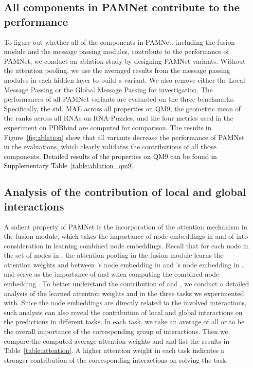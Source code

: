 \documentclass[fleqn,10pt]{wlscirep}
\newcommand{\method}{PAMNet\xspace}
\begin{document}
\subsection*{All components in \method contribute to the performance
}
To figure out whether all of the components in \method, including the fusion module and the message passing modules, contribute to the performance of \method, we conduct an ablation study by designing \method variants. Without the attention pooling, we use the averaged results from the message passing modules in each hidden layer to build a variant. We also remove either the Local Message Passing or the Global Message Passing for investigation. The performances of all \method variants are evaluated on the three benchmarks. Specifically, \textcolor{black}{the std. MAE across all properties} on QM9, the geometric mean of the ranks across all RNAs on RNA-Puzzles, and the four metrics used in the experiment on PDBbind are computed for comparison. The results in Figure~\ref{fig:ablation} show that all variants decrease the performance of \method in the evaluations, which clearly validates the contributions of all those components. \textcolor{black}{Detailed results of the properties on QM9 can be found in Supplementary Table~\ref{table:ablation_qm9}.}

\subsection*{Analysis of the contribution of local and global interactions}
A salient property of \method is the incorporation of the attention mechanism in the fusion module, which takes the importance of node embeddings in  and  of  into consideration in learning combined node embeddings. Recall that for each node  in the set of nodes  in , the attention pooling in the fusion module learns the attention weights  and  between 's node embedding  in  and 's node embedding  in .  and  serve as the importance of  and  when computing the combined node embedding . To better understand the contribution of  and , we conduct a detailed analysis of the learned attention weights  and  in the three tasks we experimented with. Since the node embeddings are directly related to the involved interactions, such analysis can also reveal the contribution of local and global interactions on the predictions in different tasks. In each task, we take an average of all  or  to be the overall importance of the corresponding group of interactions. Then we compare the computed average attention weights  and  and list the results in Table~\ref{table:attention}. A higher attention weight in each task indicates a stronger contribution of the corresponding interactions on solving the task. 
\end{document}
